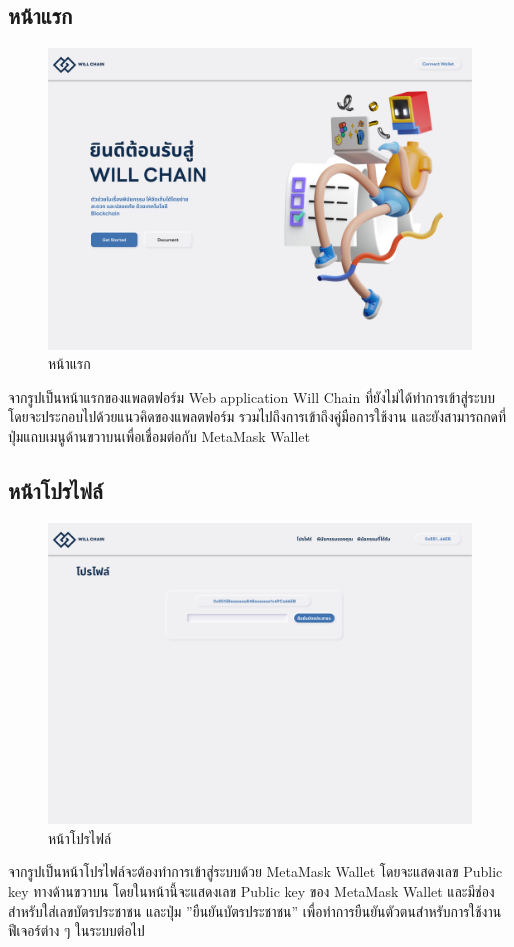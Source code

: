 \documentclass[12pt,oneside,openright,a4paper]{cpe-thai-project}
\begin{document}
\subsection{หน้าแรก}
		\begin{figure}[!thb]
			\centering
			\includegraphics[scale=0.2]{Home}
			\caption{หน้าแรก}
		\end{figure}
		\FloatBarrier
		\tab จากรูปเป็นหน้าแรกของแพลตฟอร์ม Web application Will Chain ที่ยังไม่ได้ทำการเข้าสู่ระบบ โดยจะประกอบไปด้วยแนวคิดของแพลตฟอร์ม รวมไปถึงการเข้าถึงคู่มือการใช้งาน และยังสามารถกดที่ปุ่มแถบเมนูด้านขวาบนเพื่อเชื่อมต่อกับ MetaMask Wallet
\subsection{หน้าโปรไฟล์}
		\begin{figure}[!thb]
			\centering
			\includegraphics[scale=0.2]{profile}
			\caption{หน้าโปรไฟล์}
		\end{figure}
		\FloatBarrier
		\tab จากรูปเป็นหน้าโปรไฟล์จะต้องทำการเข้าสู่ระบบด้วย MetaMask Wallet โดยจะแสดงเลข Public key ทางด้านขวาบน โดยในหน้านี้จะแสดงเลข Public key ของ MetaMask Wallet และมีช่องสำหรับใส่เลขบัตรประชาชน และปุ่ม ''ยืนยันบัตรประชาชน'' เพื่อทำการยืนยันตัวตนสำหรับการใช้งานฟีเจอร์ต่าง ๆ ในระบบต่อไป
\end{document}
